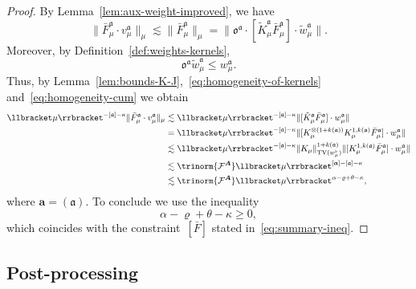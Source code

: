 \documentclass{article}
\numberwithin{equation}{section}
\theoremstyle{plain}
\theoremstyle{definition}
\begin{document}
\begin{proof}
  By Lemma~\ref{lem:aux-weight-improved}, we have
  \[
  \|\bar F_\mu^{\mathfrak a}\cdot v_\mu^{\mathfrak a}\|_\mu
  \lesssim
  \|\bar F_\mu^{\mathfrak a}\|_\mu
  =
  \|
  \mathfrak o^{\mathfrak a}
  \cdot
  [\tilde K_\mu^{\mathfrak a}\bar F_\mu^{\mathfrak a}]
  \cdot
  \tilde w_\mu^{\mathfrak a}
  \|.
  \]
  Moreover, by Definition~\ref{def:weights-kernels},
  \[ \mathfrak{o}^{\mathfrak{a}} \tilde{w}_{\mu}^{\mathfrak{a}} \leqslant
     w_{\mu}^{\mathfrak{a}} . \]
  Thus, by Lemma~\ref{lem:bounds-K-J},~\eqref{eq:homogeneity-of-kernels}
  and~\eqref{eq:homogeneity-cum} we obtain
  \[ \begin{aligned}
       \llbracket \mu \rrbracket^{- [\mathfrak{a}] - \kappa}  \|
       \bar{F}_{\mu}^{\mathfrak{a}} \cdot v^{\mathfrak{a}}_{\mu} \|_{\mu} 
       &\lesssim  \llbracket \mu \rrbracket^{- [\mathfrak{a}] - \kappa}  \|
       [\tilde{K}^{\mathfrak{a}}_{\mu} \bar{F}_{\mu}^{\mathfrak{a}}] \cdot
       w_{\mu}^{\mathfrak{a}} \| \\
       & =  \llbracket \mu \rrbracket^{- [\mathfrak{a}] - \kappa}  \|
       [K_{\mu}^{\otimes (1 + k (\mathfrak{a}))} K^{1, k (\mathfrak{a})}_{\mu}
       \bar{F}_{\mu}^{\mathfrak{a}}] \cdot w_{\mu}^{\mathfrak{a}} \| \\
       & \lesssim  \llbracket \mu \rrbracket^{- [\mathfrak{a}] - \kappa}  \|
       K_{\mu} \|_{\operatorname{TV} (w^{\flat}_{\mu})}^{1 + k (\mathfrak{a})}  \|
       [K^{1, k (\mathfrak{a})}_{\mu} \bar{F}_{\mu}^{\mathfrak{a}}] \cdot
       w_{\mu}^{\mathfrak{a}} \| \\
       & \lesssim  \trinorm{ \mathcal{F}^{\boldsymbol{A}} }
       \llbracket \mu \rrbracket^{[\boldsymbol{a}] - [\mathfrak{a}] - \kappa}\\
       & \lesssim  \trinorm{ \mathcal{F}^{\boldsymbol{A}} }
       \llbracket \mu \rrbracket^{\alpha - \varrho + \theta - \kappa} ,
     \end{aligned} \] 
     where $\boldsymbol{a}=(\mathfrak{a})$.
  To conclude we use the inequality
  \begin{equation}
    \alpha - \varrho + \theta - \kappa \geqslant 0,
    \label{eq:constraint-f-bar}
  \end{equation}
  which coincides with the constraint~$[\bar{F}]$ stated
  in~\eqref{eq:summary-ineq}.
\end{proof}

\subsection{Post-processing}\label{sec:post-processing}
\end{document}
